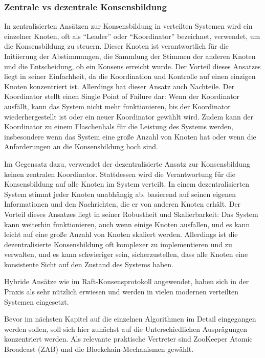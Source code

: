 \documentclass[../vs-script-first-v01.tex]{subfiles}
\begin{document}
\subsubsection{Zentrale vs dezentrale Konsensbildung}

In zentralisierten Ansätzen zur Konsensbildung in verteilten Systemen wird ein einzelner Knoten, oft als \enquote{Leader} oder \enquote{Koordinator} bezeichnet, verwendet, um die Konsensbildung zu steuern. Dieser Knoten ist verantwortlich für die Initiierung der Abstimmungen, die Sammlung der Stimmen der anderen Knoten und die Entscheidung, ob ein Konsens erreicht wurde. Der Vorteil dieses Ansatzes liegt in seiner Einfachheit, da die Koordination und Kontrolle auf einen einzigen Knoten konzentriert ist. Allerdings hat dieser Ansatz auch Nachteile. Der Koordinator stellt einen Single Point of Failure dar: Wenn der Koordinator ausfällt, kann das System nicht mehr funktionieren, bis der Koordinator wiederhergestellt ist oder ein neuer Koordinator gewählt wird. Zudem kann der Koordinator zu einem Flaschenhals für die Leistung des Systems werden, insbesondere wenn das System eine große Anzahl von Knoten hat oder wenn die Anforderungen an die Konsensbildung hoch sind.

Im Gegensatz dazu, verwendet der dezentralisierte Ansatz zur Konsensbildung keinen zentralen Koordinator. Stattdessen wird die Verantwortung für die Konsensbildung auf alle Knoten im System verteilt. In einem dezentralisierten System stimmt jeder Knoten unabhängig ab, basierend auf seinen eigenen Informationen und den Nachrichten, die er von anderen Knoten erhält. Der Vorteil dieses Ansatzes liegt in seiner Robustheit und Skalierbarkeit: Das System kann weiterhin funktionieren, auch wenn einige Knoten ausfallen, und es kann leicht auf eine große Anzahl von Knoten skaliert werden. Allerdings ist die dezentralisierte Konsensbildung oft komplexer zu implementieren und zu verwalten, und es kann schwieriger sein, sicherzustellen, dass alle Knoten eine konsistente Sicht auf den Zustand des Systems haben.

Hybride Ansätze wie im Raft-Konsensprotokoll angewendet, haben sich in der Praxis als sehr nützlich erwiesen und werden in vielen modernen verteilten Systemen eingesetzt.

Bevor im nächsten Kapitel auf die einzelnen Algorithmen im Detail eingegangen werden sollen, soll sich hier zunächst auf die Unterschiedlichen Ausprägungen konzentriert werden. Als relevante praktische Vertreter sind ZooKeeper Atomic Broadcast (ZAB) und die Blockchain-Mechanismen gewählt.
\end{document}

